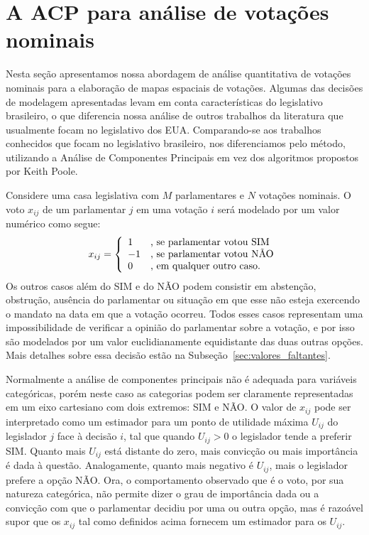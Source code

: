 \documentclass[
	article,			%
	12pt,				%
	oneside,			%
	a4paper,			%
	english,			%
	brazil,				%
	sumario=tradicional,
	oldfontcommands %
	]{abntex2}
\newcommand\nay{NÃO\xspace}
\newcommand\yea{SIM\xspace}
\begin{document}

\section{A ACP para análise de votações nominais}
\label{sec:acp}

Nesta seção apresentamos nossa abordagem de análise quantitativa de votações nominais para a elaboração de mapas espaciais de votações. Algumas das decisões de modelagem apresentadas levam em conta características do legislativo brasileiro, o que diferencia nossa análise de outros trabalhos da literatura que usualmente focam no legislativo dos EUA. Comparando-se aos trabalhos conhecidos que focam no legislativo brasileiro, nos diferenciamos pelo método, utilizando a Análise de Componentes Principais em vez dos algoritmos propostos por Keith Poole.

Considere uma casa legislativa com $M$ parlamentares e $N$ votações nominais. O voto $x_{ij}$ de um parlamentar $j$ em uma votação $i$ será modelado por um valor numérico como segue:
\[
   x_{ij} = \left\{ 
     \begin{array}{l l}
        1 & \text{, se parlamentar votou \yea} \\
       -1 & \text{, se parlamentar votou \nay} \\
        0 & \text{, em qualquer outro caso.} 
     \end{array} \right.
\]
Os outros casos além do \yea e do \nay podem consistir em abstenção, obstrução, ausência do parlamentar ou situação em que esse não esteja exercendo o mandato na data em que a votação ocorreu. Todos esses casos representam uma impossibilidade de verificar a opinião do parlamentar sobre a votação, e por isso são modelados por um valor euclidianamente equidistante das duas outras opções. Mais detalhes sobre essa decisão estão na Subseção~\ref{sec:valores_faltantes}.

Normalmente a análise de componentes principais não é adequada para variáveis categóricas, porém neste caso as categorias podem ser claramente representadas em um eixo cartesiano com dois extremos: SIM e NÃO. O valor de $x_{ij}$ pode ser interpretado como um estimador para um ponto de utilidade máxima $U_{ij}$ do legislador $j$ face à decisão $i$, tal que quando $U_{ij} > 0$ o legislador tende a preferir \yea. Quanto mais $U_{ij}$ está distante do zero, mais convicção ou mais importância é dada à questão. Analogamente, quanto mais negativo é $U_{ij}$, mais o legislador prefere a opção \nay. Ora, o comportamento observado que é o voto, por sua natureza categórica, não permite dizer o grau de importância dada ou a convicção com que o parlamentar decidiu por uma ou outra opção, mas é razoável supor que os $x_{ij}$ tal como definidos acima fornecem um estimador para os $U_{ij}$.
\end{document}
